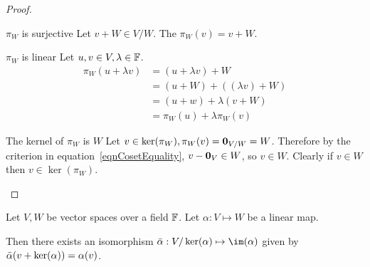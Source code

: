 \documentclass[../Main.tex]{subfiles}
\begin{document}
\begin{proof}
    \begin{subproof}{$\pi_W$ is surjective}
        Let $v + W \in V / W$. The $\pi_W (v) = v + W$.
    \end{subproof}
    \begin{subproof}{$\pi_W$ is linear}
        Let $u, v \in V, \lambda \in \mathbb{F}$.
        \begin{align*}
            \pi_W(u + \lambda v) &= (u + \lambda v) + W \\
            &= (u + W) + ((\lambda v) + W) \\
            &= (u + w) + \lambda (v + W) \\
            &= \pi_W (u) + \lambda \pi_W (v)
        \end{align*}
    \end{subproof}
    \begin{subproof}{The kernel of $\pi_W$ is $W$}
        Let $v \in \ker(\pi_W), \pi_W(v) = \boldsymbol{0}_{V / W} = W$. Therefore by the criterion in equation~\ref{eqnCosetEquality}, $v - \boldsymbol{0}_V \in W$, so $v \in W$. Clearly if $v \in W$ then $v \in \ker(\pi_W)$.
    \end{subproof}
\end{proof}
\begin{theorem}
    Let $V, W$ be vector spaces over a field $\mathbb{F}$. Let $\alpha : V \mapsto W$ be a linear map.

    Then there exists an isomorphism $\bar\alpha : V / \kera \mapsto \im(\alpha)$ given by $\bar\alpha(v + \ker(\alpha)) = \alpha(v)$.
    \label{thmIsom1}
\end{theorem}
\end{document}
